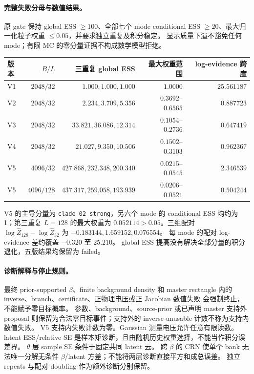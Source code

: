 \paragraph{完整失败分母与数值结果。}
原 gate 保持 global ESS $\ge100$、全部七个 mode conditional ESS
$\ge20$、最大归一化粒子权重 $\le0.05$，并要求独立重复及积分稳定。
显示质量下溢不豁免任何 mode；有限 MC 的零分量证据不构成数学模型拒绝。
\begin{center}
\small
\begin{tabular}{lrrrr}
\hline
版本 & $B/L$ & 三重复 global ESS & 最大权重范围 & log-evidence 跨度\\
\hline
V1 & $2048/32$ & $1.000,1.000,1.000$ & $1.0000$ & $25.561187$\\
V2 & $2048/32$ & $2.234,3.709,5.356$ & $0.3692$--$0.6565$ & $0.887723$\\
V3 & $2048/32$ & $33.821,36.086,12.314$ & $0.1054$--$0.2736$ & $0.647419$\\
V4 & $2048/32$ & $21.027,9.350,10.506$ & $0.1502$--$0.3103$ & $0.962367$\\
V5 & $4096/32$ & $427.868,232.348,200.340$ & $0.0215$--$0.0545$ & $2.346539$\\
V5 & $4096/128$ & $437.317,259.058,193.939$ & $0.0206$--$0.0521$ & $0.504244$\\
\hline
\end{tabular}
\end{center}
V5 的主导分量为 \texttt{clade\_02\_strong}，另六个 mode 的
conditional ESS 均约为 1；第三重复 $L=128$ 的最大权重为
$0.052114>0.05$。三组配对
$\log\widehat Z_{128}-\log\widehat Z_{32}$ 为
$-0.183144,1.659152,0.076554$。
每 mode 的配对 log-evidence 差约覆盖 $-0.320$ 至 $25.210$。
global ESS 提高没有解决全部分量的积分退化，五版结果均保留为 failed。

\paragraph{诊断解释与停止规则。}
最终 prior-supported $\beta$、finite background density 和 master rectangle
内的 inverse、branch、certificate、正物理电压或正 Jacobian 数值失败
会强制终止，不能赋予零目标概率。
参数、background、source-prior 或已声明 master 支持外 proposal
则保留为合法零目标事件；支持外的 inverse-unusable 计数不称为支持内数值失败。
V5 支持内失败计数为零。Gaussian 测量电压允许任意有限读数。
latent ESS/relative SE 是样本矩诊断，且由随机历史权重选择，不能当作积分误差界。
$\theta$ 层 sample SE 条件于固定共同 latent 云。
跨 $\beta$ 的 CRN 使单个 bank 无法唯一分解无条件
$\beta$/latent 方差；不能将两层诊断直接平方和成总误差。
独立 repeats 与配对 doubling 作为额外诊断分别保留。


